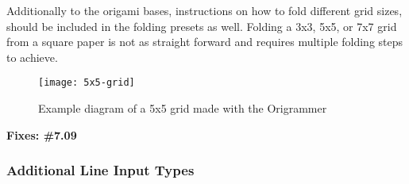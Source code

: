 Additionally to the origami bases, instructions on how to fold different grid sizes, should be included in the folding presets as well. Folding a 3x3, 5x5, or 7x7 grid from a square paper is not as straight forward and requires multiple folding steps to achieve. 

 \begin{figure}[h]
	\centering
	\texttt{[image: 5x5-grid]}
	\caption{Example diagram of a 5x5 grid made with the Origrammer}
	\label{fig:5x5-grid}
\end{figure}

\textbf{Fixes: \#7.09}

\newpage
\subsubsection{Additional Line Input Types}

